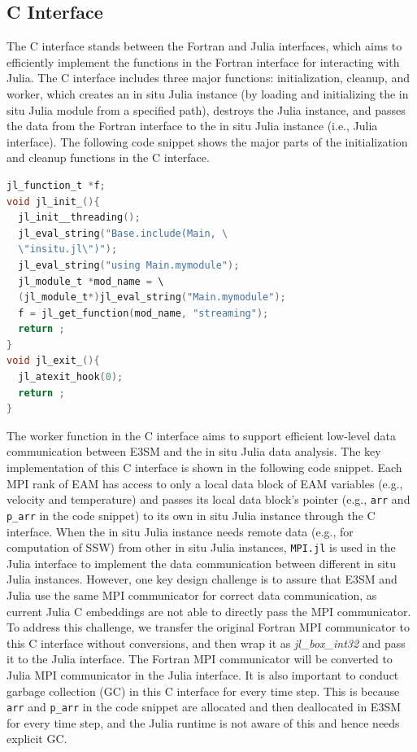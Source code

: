 \documentclass{juliacon}
\begin{document}
\subsection{C Interface}


The C interface stands between the Fortran and Julia interfaces, which aims to efficiently implement the functions in the Fortran interface for interacting with Julia. The C interface includes three major functions: initialization, cleanup, and worker, which creates an in situ Julia instance (by loading and initializing the in situ Julia module from a specified path), destroys the Julia instance, and passes the data from the Fortran interface to the in situ Julia instance (i.e., Julia interface). The following code snippet shows the major parts of the initialization and cleanup functions in the C interface.

\begin{minipage}{\linewidth}
\begin{lstlisting}[language = C, caption={C interface initialization and cleanup.}]
jl_function_t *f;
void jl_init_(){
  jl_init__threading();
  jl_eval_string("Base.include(Main, \
  \"insitu.jl\")");
  jl_eval_string("using Main.mymodule");
  jl_module_t *mod_name = \
  (jl_module_t*)jl_eval_string("Main.mymodule");
  f = jl_get_function(mod_name, "streaming");
  return ;
}
void jl_exit_(){
  jl_atexit_hook(0);
  return ;
}
\end{lstlisting}
\end{minipage}


The worker function in the C interface aims to support efficient low-level data communication between E3SM and the in situ Julia data analysis. The key implementation of this C interface is shown in the following code snippet. Each MPI rank of EAM has access to only a local data block of EAM variables (e.g., velocity and temperature) and passes its local data block's pointer (e.g., \texttt{arr} and \texttt{p\_arr} in the code snippet) to its own in situ Julia instance through the C interface. When the in situ Julia instance needs remote data (e.g., for computation of SSW) from other in situ Julia instances, \texttt{MPI.jl} is used in the Julia interface to implement the data communication between different in situ Julia instances. However, one key design challenge is to assure that E3SM and Julia use the same MPI communicator for correct data communication, as current Julia C embeddings are not able to directly pass the MPI communicator. To address this challenge, we transfer the original Fortran MPI communicator to this C interface without conversions, and then wrap it as \textit{jl\_box\_int32} and pass it to the Julia interface. The Fortran MPI communicator will be converted to Julia MPI communicator in the Julia interface. It is also important to conduct garbage collection (GC) in this C interface for every time step. This is because \texttt{arr} and \texttt{p\_arr} in the code snippet are allocated and then deallocated in E3SM for every time step, and the Julia runtime is not aware of this and hence needs explicit GC.
\end{document}

